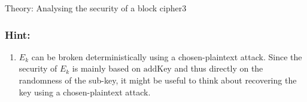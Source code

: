 \documentclass[a4paper]{article}
\begin{document}
\begin{problem}{Theory: Analysing the security of a block cipher}{3}
\begin{enumerate}
  \subsubsection*{Hint:}\begin{enumerate}
  	\item[] $E_k$ can be broken deterministically using a chosen-plaintext attack. Since the security of $E_k$ is mainly based on $\mathrm{addKey}$ and thus directly on the randomness of the sub-key, it might be useful to think about recovering the key using a chosen-plaintext attack. 
  \end{enumerate}
\end{enumerate}
\end{problem}
\end{document}
